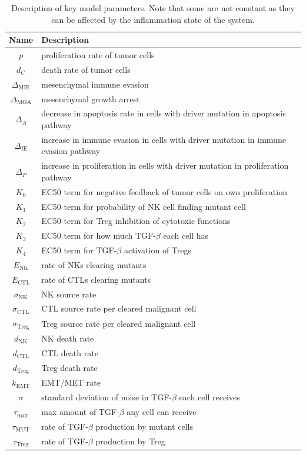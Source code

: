 \documentclass[11pt]{article}
\begin{document}
\begin{table}
\begin{center}
 \begin{tabular}{| c | l |} 
 \hline
 {\bf Name} & {\bf Description}  \\ [0.5ex] 
 \hline
 $p$ & proliferation rate of tumor cells \\ 
 \hline
 $d_C$  & death rate of tumor cells \\
 \hline
$\Delta_\text{MIE}$ &  mesenchymal immune evasion \\
 \hline
 $\Delta_\text{MGA}$ & mesenchymal growth arrest    \\
 \hline
  $\Delta_A$ & decrease in apoptosis rate in cells with driver mutation in apoptosis pathway \\ 
    \hline
  $\Delta_\text{IE}$ & increase in immune evasion in cells with driver mutation in immune evasion pathway \\
  \hline
  $\Delta_P$ & increase in proliferation in cells with driver mutation in proliferation pathway\\
  \hline
 $K_0$ & EC50 term for negative feedback of tumor cells on own proliferation\\
 \hline
 $K_1$ & EC50 term for probability of NK cell finding mutant cell\\
 \hline
  $K_2$ & EC50 term for Treg inhibition of cytotoxic functions  \\
  \hline
  $K_3$ & EC50 term for how much TGF-$\beta$ each cell has \\
  \hline
  $K_4$ & EC50 term for TGF-$\beta$ activation of Tregs \\
  \hline
 $E_\text{NK}$ & rate of NKs clearing mutants  \\
  \hline
  $E_\text{CTL}$ & rate of CTLs clearing mutants \\
  \hline
  $\sigma_\text{NK}$ & NK source rate \\ 
  \hline
  $\sigma_\text{CTL}$ & CTL source rate per cleared malignant cell \\ 
  \hline
  $\sigma_\text{Treg}$ & Treg source rate per cleared malignant cell \\ 
  \hline
  $d_\text{NK}$ & NK death rate \\ 
  \hline
  $d_\text{CTL}$ & CTL death rate \\ 
  \hline
  $d_\text{Treg}$ & Treg death rate \\ 
  \hline
  $k_\text{EMT}$ & EMT/MET rate  \\
  \hline
  $\sigma$ & standard deviation of noise in TGF-$\beta$ each cell receives  \\
  \hline
 $\tau_\text{max}$ & max amount of TGF-$\beta$ any cell can receive \\
  \hline 
 $\tau_\text{MUT}$ & rate of TGF-$\beta$ production by mutant cells\\
  \hline
 $\tau_\text{Treg}$ & rate of TGF-$\beta$ production by Treg\\
  \hline
\end{tabular}
  \caption{Description of key model parameters. Note that some are not constant as they can be affected by the inflammation state of the system.}
\end{center}
\end{table}
\end{document}
